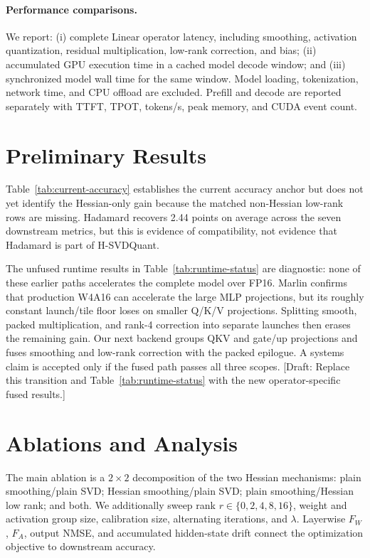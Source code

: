 \documentclass{article}
\newcommand{\method}{H-SVDQuant}
\newcommand{\draftnote}[1]{\textcolor{red!70!black}{[Draft: #1]}}
\begin{document}
\paragraph{Performance comparisons.}
We report: (i) complete Linear operator latency, including smoothing,
activation quantization, residual multiplication, low-rank correction, and
bias; (ii) accumulated GPU execution time in a cached model decode window; and
(iii) synchronized model wall time for the same window. Model loading,
tokenization, network time, and CPU offload are excluded. Prefill and decode are
reported separately with TTFT, TPOT, tokens/s, peak memory, and CUDA event count.

\section{Preliminary Results}



Table~\ref{tab:current-accuracy} establishes the current accuracy anchor but
does not yet identify the Hessian-only gain because the matched non-Hessian
low-rank rows are missing. Hadamard recovers 2.44 points on average across the
seven downstream metrics, but this is evidence of compatibility, not evidence
that Hadamard is part of \method{}.



The unfused runtime results in Table~\ref{tab:runtime-status} are diagnostic:
none of these earlier paths accelerates the complete model over FP16. Marlin confirms that
production W4A16 can accelerate the large MLP projections, but its roughly
constant launch/tile floor loses on smaller Q/K/V projections. Splitting smooth,
packed multiplication, and rank-4 correction into separate launches then erases
the remaining gain. Our next backend groups QKV and gate/up projections and
fuses smoothing and low-rank correction with the packed epilogue. A systems
claim is accepted only if the fused path passes all three scopes.
\draftnote{Replace this transition and Table~\ref{tab:runtime-status} with the
new operator-specific fused results.}

\section{Ablations and Analysis}

The main ablation is a $2\times2$ decomposition of the two Hessian mechanisms:
plain smoothing/plain SVD; Hessian smoothing/plain SVD; plain smoothing/Hessian
low rank; and both. We additionally sweep rank $r\in\{0,2,4,8,16\}$, weight and
activation group size, calibration size, alternating iterations, and
$\lambda$. Layerwise $F_W$, $F_A$, output NMSE, and accumulated hidden-state
drift connect the optimization objective to downstream accuracy.
\end{document}
